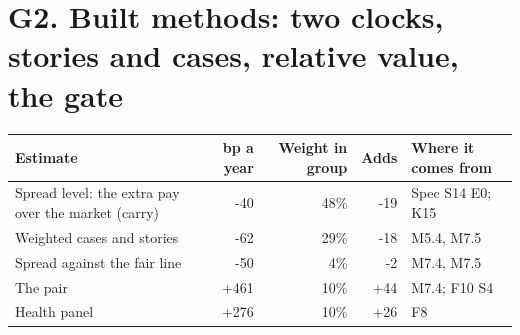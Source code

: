 \documentclass[11pt,a4paper]{article}
\begin{document}
\section*{G2. Built methods: two clocks, stories and cases, relative value, the gate}
\par\noindent{}
\begin{center}\footnotesize\setlength{\tabcolsep}{3.5pt}\begin{tabular}{@{}p{6.2cm}rrrp{4.2cm}@{}}\toprule
Estimate & bp a year & Weight in group & Adds & Where it comes from \\\midrule
Spread level: the extra pay over the market (carry) & -40 & 48\% & -19 & Spec S14 E0; K15 \\
Weighted cases and stories & -62 & 29\% & -18 & M5.4, M7.5 \\
Spread against the fair line & -50 & 4\% & -2 & M7.4, M7.5 \\
The pair & +461 & 10\% & +44 & M7.4; F10 S4 \\
Health panel & +276 & 10\% & +26 & F8 \\
\bottomrule\end{tabular}\end{center}
\end{document}
